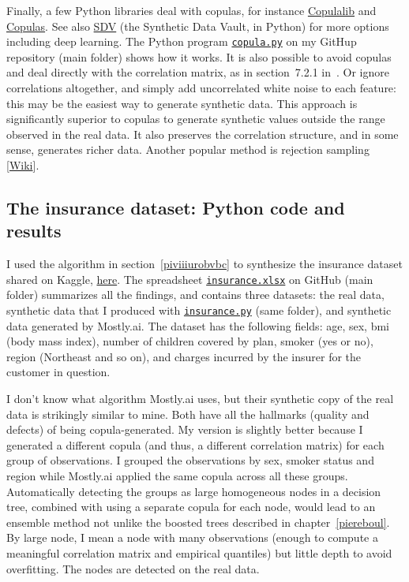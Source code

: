 \documentclass[oneside,10pt]{book}
\begin{document}
Finally, a few Python libraries 
  deal with copulas, for instance \href{https://pypi.org/project/copulalib/}{Copulalib} and \href{https://pypi.org/project/copulas/}{Copulas}. See also \href{https://pypi.org/project/sdv/}{SDV} (the Synthetic Data Vault, in Python) for more options including deep learning. The Python program \href{https://github.com/VincentGranville/Main/blob/main/copula.py}{\texttt{copula.py}} on my GitHup repository (main folder) 
shows how it works. It is also possible to avoid copulas and deal directly with the correlation matrix, as in section~7.2.1 in~\cite{vgelsevier}. Or ignore correlations altogether, and simply add uncorrelated white noise to each feature: this may be the easiest way to generate synthetic data. This approach is 
 significantly superior to copulas
  to generate synthetic values outside the range observed in the real data. It also preserves the correlation structure, and in some sense, generates richer data. Another popular method is \textcolor{index}{rejection sampling} [\href{https://en.wikipedia.org/wiki/Rejection_sampling}{Wiki}].

\subsection{The insurance dataset: Python code and results}\label{sdsvc}

I used the algorithm in section~\ref{piviiiurobvbc} to synthesize the insurance dataset shared on Kaggle, 
 \href{https://www.kaggle.com/datasets/teertha/ushealthinsurancedataset}{here}. The spreadsheet 
\href{https://github.com/VincentGranville/Main/blob/main/insurance.xlsx}{\texttt{insurance.xlsx}} on GitHub (main folder) summarizes all the findings, and contains three datasets: the real data, synthetic data that I produced with
 \href{https://github.com/VincentGranville/Main/blob/main/insurance.py}{\texttt{insurance.py}} (same folder), and synthetic data generated by Mostly.ai. The dataset has the following fields: age, sex, bmi (body mass index), number of children covered by plan, smoker (yes or no), 
 region (Northeast and so on), and charges incurred by the insurer for the customer in question. 

I don't know what algorithm Mostly.ai uses,
  but their synthetic copy of the real data is strikingly similar to mine. Both have all the hallmarks (quality and defects) of being copula-generated. My version is slightly better because I generated a different copula (and thus, a different correlation matrix) for each group of observations. I grouped the observations by sex, smoker status and region while Mostly.ai applied the same copula across all these groups. 
Automatically detecting the groups as large homogeneous \textcolor{index}{nodes} in a decision tree, combined with using a separate copula for each node, would lead to an \textcolor{index}{ensemble method} not unlike the \textcolor{index}{boosted trees} described in chapter~\ref{piereboul}.  By large node, I mean a node with many observations  (enough to compute a meaningful correlation matrix and empirical quantiles) but little depth to avoid overfitting. The nodes are detected on the real data.
 
\end{document}
